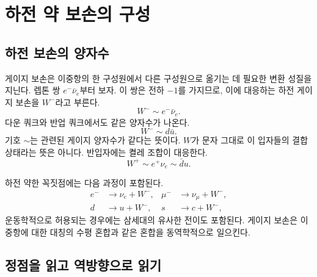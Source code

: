 \section{하전 약 보손의 구성}

\subsection{하전 보손의 양자수}

게이지 보손은 이중항의 한 구성원에서 다른 구성원으로 옮기는 데 필요한 변환 성질을 지닌다. 렙톤 쌍 \(e^-\bar\nu_e\)부터 보자. 이 쌍은 전하 \(-1\)를 가지므로, 이에 대응하는 하전 게이지 보손을 \(W^-\)라고 부른다.
\begin{equation}
W^-\sim e^-\bar\nu_e.
\end{equation} 다운 쿼크와 반업 쿼크에서도 같은 양자수가 나온다.
\begin{equation}
W^-\sim d\bar u.
\end{equation} 기호 \(\sim\)는 관련된 게이지 양자수가 같다는 뜻이다. \(W\)가 문자 그대로 이 입자들의 결합 상태라는 뜻은 아니다. 반입자에는 켤레 조합이 대응한다.
\begin{equation}
W^+\sim e^+\nu_e\sim\bar d u.
\end{equation}

하전 약한 꼭짓점에는 다음 과정이 포함된다.
\begin{align}
e^-&\longrightarrow\nu_e+W^-,
&
\mu^-&\longrightarrow\nu_\mu+W^-,
\label{eq:l5-lepton-w}\\
d&\longrightarrow u+W^-,
&
s&\longrightarrow c+W^-,
\label{eq:l5-quark-w}
\end{align} 운동학적으로 허용되는 경우에는 삼세대의 유사한 전이도 포함된다. 게이지 보손은 이중항에 대한 대칭의 수평 혼합과 같은 혼합을 동역학적으로 일으킨다.

\begin{classroomqa}\end{classroomqa}

\subsection{정점을 읽고 역방향으로 읽기}

